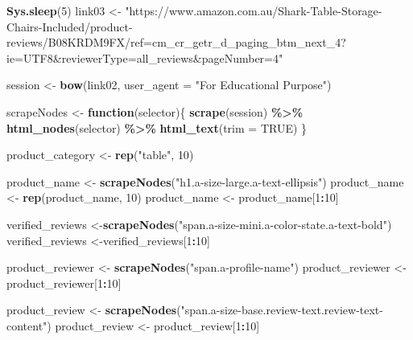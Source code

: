 \documentclass[
]{article}
\newenvironment{Shaded}{\begin{snugshade}}{\end{snugshade}}
\newcommand{\AttributeTok}[1]{\textcolor[rgb]{0.13,0.29,0.53}{#1}}
\newcommand{\ConstantTok}[1]{\textcolor[rgb]{0.56,0.35,0.01}{#1}}
\newcommand{\ControlFlowTok}[1]{\textcolor[rgb]{0.13,0.29,0.53}{\textbf{#1}}}
\newcommand{\DecValTok}[1]{\textcolor[rgb]{0.00,0.00,0.81}{#1}}
\newcommand{\FunctionTok}[1]{\textcolor[rgb]{0.13,0.29,0.53}{\textbf{#1}}}
\newcommand{\NormalTok}[1]{#1}
\newcommand{\OtherTok}[1]{\textcolor[rgb]{0.56,0.35,0.01}{#1}}
\newcommand{\SpecialCharTok}[1]{\textcolor[rgb]{0.81,0.36,0.00}{\textbf{#1}}}
\newcommand{\StringTok}[1]{\textcolor[rgb]{0.31,0.60,0.02}{#1}}
\begin{document}
\begin{Shaded}
\begin{Highlighting}[]
   \FunctionTok{Sys.sleep}\NormalTok{(}\DecValTok{5}\NormalTok{)}
\NormalTok{link03 }\OtherTok{\textless{}{-}} \StringTok{"https://www.amazon.com.au/Shark{-}Table{-}Storage{-}Chairs{-}Included/product{-}reviews/B08KRDM9FX/ref=cm\_cr\_getr\_d\_paging\_btm\_next\_4?ie=UTF8\&reviewerType=all\_reviews\&pageNumber=4"}


\NormalTok{  session }\OtherTok{\textless{}{-}} \FunctionTok{bow}\NormalTok{(link02,}
               \AttributeTok{user\_agent =} \StringTok{"For Educational Purpose"}\NormalTok{)}

\NormalTok{  scrapeNodes }\OtherTok{\textless{}{-}} \ControlFlowTok{function}\NormalTok{(selector)\{}
    \FunctionTok{scrape}\NormalTok{(session) }\SpecialCharTok{\%\textgreater{}\%}
      \FunctionTok{html\_nodes}\NormalTok{(selector) }\SpecialCharTok{\%\textgreater{}\%}
      \FunctionTok{html\_text}\NormalTok{(}\AttributeTok{trim =} \ConstantTok{TRUE}\NormalTok{)}
\NormalTok{  \}}

\NormalTok{  product\_category }\OtherTok{\textless{}{-}} \FunctionTok{rep}\NormalTok{(}\StringTok{"table"}\NormalTok{, }\DecValTok{10}\NormalTok{)}

\NormalTok{  product\_name }\OtherTok{\textless{}{-}} \FunctionTok{scrapeNodes}\NormalTok{(}\StringTok{"h1.a{-}size{-}large.a{-}text{-}ellipsis"}\NormalTok{)}
\NormalTok{  product\_name }\OtherTok{\textless{}{-}} \FunctionTok{rep}\NormalTok{(product\_name, }\DecValTok{10}\NormalTok{)}
\NormalTok{  product\_name }\OtherTok{\textless{}{-}}\NormalTok{ product\_name[}\DecValTok{1}\SpecialCharTok{:}\DecValTok{10}\NormalTok{]}
  
\NormalTok{  verified\_reviews }\OtherTok{\textless{}{-}}\FunctionTok{scrapeNodes}\NormalTok{(}\StringTok{"span.a{-}size{-}mini.a{-}color{-}state.a{-}text{-}bold"}\NormalTok{)}
\NormalTok{  verified\_reviews }\OtherTok{\textless{}{-}}\NormalTok{verified\_reviews[}\DecValTok{1}\SpecialCharTok{:}\DecValTok{10}\NormalTok{]}
  
\NormalTok{  product\_reviewer }\OtherTok{\textless{}{-}} \FunctionTok{scrapeNodes}\NormalTok{(}\StringTok{"span.a{-}profile{-}name"}\NormalTok{)}
\NormalTok{  product\_reviewer }\OtherTok{\textless{}{-}}\NormalTok{ product\_reviewer[}\DecValTok{1}\SpecialCharTok{:}\DecValTok{10}\NormalTok{]}
  
\NormalTok{  product\_review }\OtherTok{\textless{}{-}} \FunctionTok{scrapeNodes}\NormalTok{(}\StringTok{"span.a{-}size{-}base.review{-}text.review{-}text{-}content"}\NormalTok{)}
\NormalTok{  product\_review }\OtherTok{\textless{}{-}}\NormalTok{ product\_review[}\DecValTok{1}\SpecialCharTok{:}\DecValTok{10}\NormalTok{]}
  

\end{Highlighting}
\end{Shaded}
\end{document}
